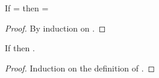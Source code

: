 \begin{lemma} \label{appendix:lemma:pathindependent}
  If \inopenvnoeq{\openv{}}{\object{}} = 
  then \inopenvnoeq{\openv{}}{\pth{\pathelem{}}{\object{}}} =
 \begin{proof}
   By induction on \pathelem{}.
%
%
%
%
 \end{proof}
\end{lemma}

\begin{lemma}[\classconst]\label{appendix:lemma:classconst}
  If
  {\opsem{\openv{}}{\appexp{\classconst{}}{\openv{}({\pth{\pathelem{}}{\x{}}})}}{\class{}}} then
  {\satisfies{\openv{}}{\isprop{\class{}}{\pth{\pathelem{}}{\x{}}}}}.

  \begin{proof}
    Induction on the definition of {\classconst{}}.
  \end{proof}
\end{lemma}

